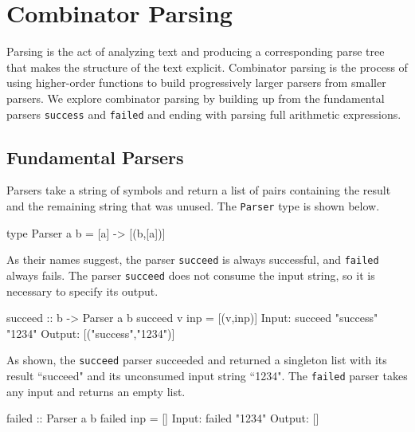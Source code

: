 \documentclass[11pt]{article}
\begin{document}
\section{Combinator Parsing}

Parsing is the act of analyzing text and producing a corresponding parse tree that makes the structure of the text explicit. Combinator parsing is the process of using higher-order functions to build progressively larger parsers from smaller parsers. We explore combinator parsing by building up from the fundamental parsers \texttt{success} and \texttt{failed} and ending with parsing full arithmetic expressions. 

\subsection{Fundamental Parsers}

Parsers take a string of symbols and return a list of pairs containing the result and the remaining string that was unused. The \texttt{Parser} type is shown below.

\hspace{2cm}\begin{verbbox}
type Parser a b = [a] -> [(b,[a])]
\end{verbbox}
\theverbbox

As their names suggest, the parser \texttt{succeed} is always successful, and \texttt{failed} always fails. The parser \texttt{succeed} does not consume the input string, so it is necessary to specify its output. 

\hspace{2cm}\begin{verbbox}
succeed :: b -> Parser a b
succeed v inp = [(v,inp)]
Input:  succeed "success" "1234" 
Output: [("success","1234")]
\end{verbbox}
\theverbbox

As shown, the \texttt{succeed} parser succeeded and returned a singleton list with its result ``succeed" and its unconsumed input string ``1234". The \texttt{failed} parser takes any input and returns an empty list.

\hspace{2cm}\begin{verbbox}
failed :: Parser a b
failed inp = []
Input:  failed "1234"
Output: []
\end{verbbox}
\theverbbox
\end{document}
